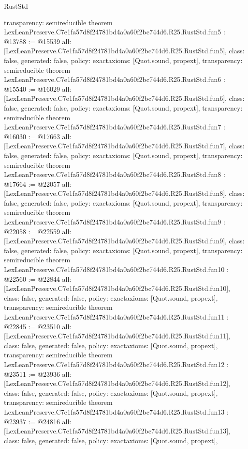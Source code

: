 \begin{lexlean}{RustStd}
\begin{coremodule}
{  transparency: semireducible
}
theorem LexLeanPreserve.C7e1fa57d8f24781bd4a0a60f2bc744d6.R25.RustStd.fun5 : @13788 := @15539 {
  all: [LexLeanPreserve.C7e1fa57d8f24781bd4a0a60f2bc744d6.R25.RustStd.fun5],
  class: false,
  generated: false,
  policy: exact{axioms: [Quot.sound, propext]},
  transparency: semireducible
}
theorem LexLeanPreserve.C7e1fa57d8f24781bd4a0a60f2bc744d6.R25.RustStd.fun6 : @15540 := @16029 {
  all: [LexLeanPreserve.C7e1fa57d8f24781bd4a0a60f2bc744d6.R25.RustStd.fun6],
  class: false,
  generated: false,
  policy: exact{axioms: [Quot.sound, propext]},
  transparency: semireducible
}
theorem LexLeanPreserve.C7e1fa57d8f24781bd4a0a60f2bc744d6.R25.RustStd.fun7 : @16030 := @17663 {
  all: [LexLeanPreserve.C7e1fa57d8f24781bd4a0a60f2bc744d6.R25.RustStd.fun7],
  class: false,
  generated: false,
  policy: exact{axioms: [Quot.sound, propext]},
  transparency: semireducible
}
theorem LexLeanPreserve.C7e1fa57d8f24781bd4a0a60f2bc744d6.R25.RustStd.fun8 : @17664 := @22057 {
  all: [LexLeanPreserve.C7e1fa57d8f24781bd4a0a60f2bc744d6.R25.RustStd.fun8],
  class: false,
  generated: false,
  policy: exact{axioms: [Quot.sound, propext]},
  transparency: semireducible
}
theorem LexLeanPreserve.C7e1fa57d8f24781bd4a0a60f2bc744d6.R25.RustStd.fun9 : @22058 := @22559 {
  all: [LexLeanPreserve.C7e1fa57d8f24781bd4a0a60f2bc744d6.R25.RustStd.fun9],
  class: false,
  generated: false,
  policy: exact{axioms: [Quot.sound, propext]},
  transparency: semireducible
}
theorem LexLeanPreserve.C7e1fa57d8f24781bd4a0a60f2bc744d6.R25.RustStd.fun10 : @22560 := @22844 {
  all: [LexLeanPreserve.C7e1fa57d8f24781bd4a0a60f2bc744d6.R25.RustStd.fun10],
  class: false,
  generated: false,
  policy: exact{axioms: [Quot.sound, propext]},
  transparency: semireducible
}
theorem LexLeanPreserve.C7e1fa57d8f24781bd4a0a60f2bc744d6.R25.RustStd.fun11 : @22845 := @23510 {
  all: [LexLeanPreserve.C7e1fa57d8f24781bd4a0a60f2bc744d6.R25.RustStd.fun11],
  class: false,
  generated: false,
  policy: exact{axioms: [Quot.sound, propext]},
  transparency: semireducible
}
theorem LexLeanPreserve.C7e1fa57d8f24781bd4a0a60f2bc744d6.R25.RustStd.fun12 : @23511 := @23936 {
  all: [LexLeanPreserve.C7e1fa57d8f24781bd4a0a60f2bc744d6.R25.RustStd.fun12],
  class: false,
  generated: false,
  policy: exact{axioms: [Quot.sound, propext]},
  transparency: semireducible
}
theorem LexLeanPreserve.C7e1fa57d8f24781bd4a0a60f2bc744d6.R25.RustStd.fun13 : @23937 := @24816 {
  all: [LexLeanPreserve.C7e1fa57d8f24781bd4a0a60f2bc744d6.R25.RustStd.fun13],
  class: false,
  generated: false,
  policy: exact{axioms: [Quot.sound, propext]},
}
\end{coremodule}
\end{lexlean}
